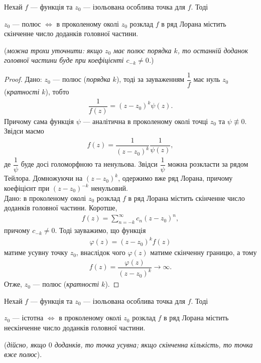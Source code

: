 \documentclass{math_library}
\begin{document}
\begin{proposition}
Нехай $f$ --- функція та $z_0$ --- ізольована особлива точка для $f$. Тоді
\begin{center}
$z_0$ --- полюс $\iff$ в проколеному околі $z_0$ розклад $f$ в ряд Лорана містить скінченне число доданків головної частини.
\end{center}
(\textit{можна трохи уточнити: якщо $z_0$ має полюс порядка $k$, то останній доданок головної частини буде при коефіцієнті $c_{-k} \neq 0$.})
\end{proposition}

\begin{proof}
\rightproof Дано: $z_0$ --- полюс (\textit{порядка $k$}), тоді за зауваженням $\dfrac{1}{f}$ має нуль $z_0$ (\textit{кратності $k$}), тобто
\begin{align*}
\dfrac{1}{f(z)} = (z-z_0)^k \psi(z).
\end{align*}
Причому сама функція $\psi$ --- аналітична в проколеному околі точці $z_0$ та $\psi \not\equiv 0$. Звідси маємо
\begin{align*}
f(z) = \dfrac{1}{(z-z_0)^k} \dfrac{1}{\psi(z)},
\end{align*}
де $\dfrac{1}{\psi}$ буде досі голоморфною та ненульова. Звідси $\dfrac{1}{\psi}$ можна розкласти за рядом Тейлора. Домножуючи на $(z-z_0)^k$, одержимо вже ряд Лорана, причому коефіцієнт при $(z-z_0)^{-k}$ ненульовий.
\bigskip \\
\leftproof Дано: в проколеному околі $z_0$ розклад $f$ в ряд Лорана містить скінченне число доданків головної частини. Коротше,
\begin{align*}
f(z) = \sum_{n=-k}^{\infty} c_n (z-z_0)^n,
\end{align*}
причому $c_{-k} \neq 0$. Тоді зауважимо, що функція
\begin{align*}
\varphi(z) = (z-z_0)^k f(z)
\end{align*}
матиме усувну точку $z_0$, внаслідок чого $\varphi(z)$ матиме скінченну границю, а тому
\begin{align*}
f(z) = \dfrac{\varphi(z)}{(z-z_0)^k} \to \infty.
\end{align*}
Отже, $z_0$ --- полюс (\textit{кратності $k$}).
\end{proof}

\begin{proposition}
Нехай $f$ --- функція та $z_0$ --- ізольована особлива точка для $f$. Тоді
\begin{center}
$z_0$ --- істотна $\iff$ в проколеному околі $z_0$ розклад $f$ в ряд Лорана містить нескінченне число доданків головної частини.
\end{center}
(\textit{дійсно, якщо $0$ доданків, то точка усувна; якщо скінченна кількість, то точка вже полюс}).
\end{proposition}
\end{document}
